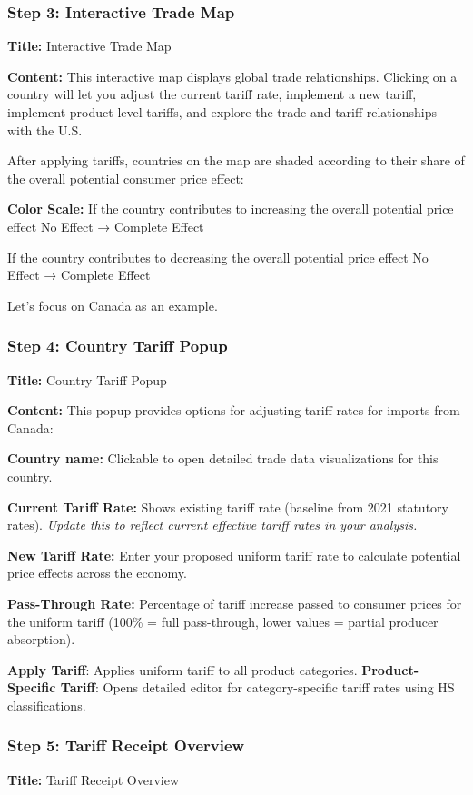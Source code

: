\documentclass[11pt]{article}
\begin{document}
\subsubsection{Step 3: Interactive Trade Map}
\textbf{Title:} Interactive Trade Map

\textbf{Content:} This interactive map displays global trade relationships. Clicking on a country will let you adjust the current tariff rate, implement a new tariff, implement product level tariffs, and explore the trade and tariff relationships with the U.S.

After applying tariffs, countries on the map are shaded according to their share of the overall potential consumer price effect:

\textbf{Color Scale:}
If the country contributes to increasing the overall potential price effect
No Effect → Complete Effect

If the country contributes to decreasing the overall potential price effect
No Effect → Complete Effect

Let's focus on Canada as an example.

\subsubsection{Step 4: Country Tariff Popup}
\textbf{Title:} Country Tariff Popup

\textbf{Content:} This popup provides options for adjusting tariff rates for imports from Canada:

\textbf{Country name:} Clickable to open detailed trade data visualizations for this country.

\textbf{Current Tariff Rate:} Shows existing tariff rate (baseline from 2021 statutory rates). \textit{Update this to reflect current effective tariff rates in your analysis.}

\textbf{New Tariff Rate:} Enter your proposed uniform tariff rate to calculate potential price effects across the economy.

\textbf{Pass-Through Rate:} Percentage of tariff increase passed to consumer prices for the uniform tariff (100\% = full pass-through, lower values = partial producer absorption).

\textbf{Apply Tariff}: Applies uniform tariff to all product categories. \textbf{Product-Specific Tariff}: Opens detailed editor for category-specific tariff rates using HS classifications.

\subsubsection{Step 5: Tariff Receipt Overview}
\textbf{Title:} Tariff Receipt Overview
\end{document}
